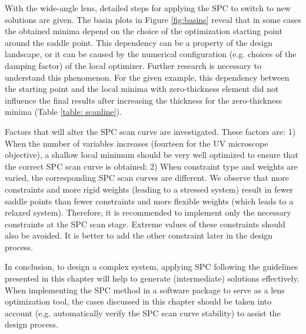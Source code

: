 With the wide-angle lens, detailed steps for applying the SPC to switch to new solutions are given. The basin plots in Figure \ref{fig:basins} reveal that in some cases the obtained minima depend on the choice of the optimization starting point around the saddle point. This dependency can be a property of the design landscape, or it can be caused by the numerical configuration (e.g. choices of the damping factor) of the local optimizer. Further research is necessary to understand this phenomenon. For the given example, this dependency between the starting point and the local minima with zero-thickness element did not influence the final results after increasing the thickness for the zero-thickness minima (Table \ref{table: scanline}).

Factors that will alter the SPC scan curve are investigated. These factors are: 1) When the number of variables increases (fourteen for the UV microscope objective), a shallow local minimum should be very well optimized to ensure that the correct SPC scan curve is obtained; 2) When constraint type and weights are varied, the corresponding SPC scan curves are different. We observe that more constraints and more rigid weights (leading to a stressed system) result in fewer saddle points than fewer constraints and more flexible weights (which leads to a relaxed system). Therefore, it is recommended to implement only the necessary constraints at the SPC scan stage. Extreme values of these constraints should also be avoided. It is better to add the other constraint later in the design process.

In conclusion, to design a complex system, applying SPC following the guidelines presented in this chapter will help to generate (intermediate) solutions effectively. When implementing the SPC method in a software package to serve as a lens optimization tool, the cases discussed in this chapter should be taken into account (e.g. automatically verify the SPC scan curve stability) to assist the design process.  




